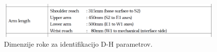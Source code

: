 \begin{figure}
  \includegraphics[width=\linewidth]{./Slike/arm_length.png}
  \caption{Dimenzije roke za identifikacijo D-H parametrov.}
  \label{fig:pa10drawing}
\end{figure}
